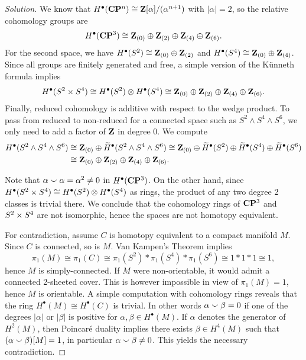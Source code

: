 \begin{proof}[Solution]
  We know that $H^\bullet(\mathbf{C}\mathbf{P}^n) \cong \mathbf{Z}[\alpha]/(\alpha^{n+1})$ with $|\alpha| = 2$, so the relative cohomology groups are
  \[
  H^\bullet(\mathbf{C}\mathbf{P}^3) \cong
  \mathbf{Z}_{(0)} \oplus \mathbf{Z}_{(2)} \oplus \mathbf{Z}_{(4)} \oplus \mathbf{Z}_{(6)}.
  \]
  For the second space, we have $H^\bullet(S^2) \cong \mathbf{Z}_{(0)} \oplus \mathbf{Z}_{(2)}$ and $H^\bullet(S^4) \cong \mathbf{Z}_{(0)} \oplus \mathbf{Z}_{(4)}$. Since all groups are finitely generated and free, a simple version of the K\"unneth formula implies
  \[
  H^\bullet(S^2 \times S^4) \cong
  H^\bullet(S^2) \otimes H^\bullet(S^4) \cong
  \mathbf{Z}_{(0)} \oplus \mathbf{Z}_{(2)} \oplus \mathbf{Z}_{(4)} \oplus \mathbf{Z}_{(6)}.
  \]
  Finally, reduced cohomology is additive with respect to the wedge product. To pass from reduced to non-reduced for a connected space such as $S^2 \wedge S^4 \wedge S^6$, we only need to add a factor of $\mathbf{Z}$ in degree $0$. We compute
  \begin{align*}
    H^\bullet(S^2 \wedge S^4 \wedge S^6)
    &\cong
    \mathbf{Z}_{(0)} \oplus \widetilde{H}^\bullet(S^2 \wedge S^4 \wedge S^6) \cong
    \mathbf{Z}_{(0)} \oplus \widetilde{H}^\bullet(S^2) \oplus \widetilde{H}^\bullet(S^4) \oplus \widetilde{H}^\bullet(S^6) \\
    &\cong
    \mathbf{Z}_{(0)} \oplus \mathbf{Z}_{(2)} \oplus \mathbf{Z}_{(4)} \oplus \mathbf{Z}_{(6)}.
  \end{align*}
  
  Note that $\alpha \smallsmile \alpha = \alpha^2 \neq 0$ in $H^\bullet(\mathbf{C}\mathbf{P}^3)$. On the other hand, since $H^\bullet(S^2 \times S^4) \cong H^\bullet(S^2) \otimes H^\bullet(S^4)$ as rings, the product of any two degree 2 classes is trivial there. We conclude that the cohomology rings of $\mathbf{C}\mathbf{P}^3$ and $S^2 \times S^4$ are not isomorphic, hence the spaces are not homotopy equivalent.
  
  For contradiction, assume $C$ is homotopy equivalent to a compact manifold $M$. Since $C$ is connected, so is $M$. Van Kampen's Theorem implies
  \[
  \pi_1(M) \cong \pi_1(C) \cong \pi_1(S^2) \ast \pi_1(S^4) \ast \pi_1(S^6) \cong 1 \ast 1 \ast 1 \cong 1,
  \]
  hence $M$ is simply-connected. If $M$ were non-orientable, it would admit a connected 2-sheeted cover. This is however impossible in view of $\pi_1(M) = 1$, hence $M$ is orientable. A simple computation with cohomology rings reveals that the ring $H^\bullet(M) \cong H^\bullet(C)$ is trivial. In other words $\alpha \smallsmile \beta = 0$ if one of the degrees $|\alpha|$ or $|\beta|$ is positive for $\alpha, \beta \in H^\bullet(M)$. If $\alpha$ denotes the generator of $H^2(M)$, then Poincar\'e duality implies there exists $\beta \in H^4(M)$ such that $(\alpha \smallsmile \beta)[M] = 1$, in particular $\alpha \smallsmile \beta \neq 0$. This yields the necessary contradiction.
\end{proof}

